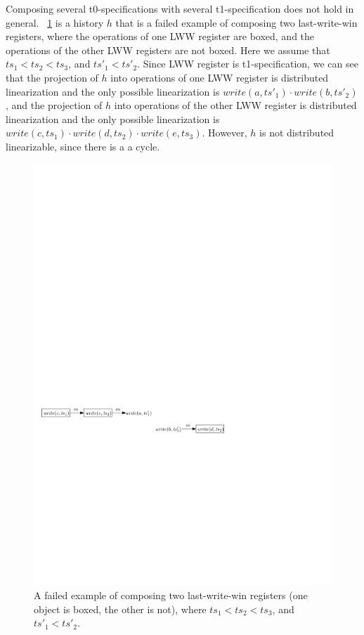 Composing several t0-specifications with several t1-specification does not hold in general. \figurename~\ref{fig:a failed example of composing two last-write-win registers} is a history $h$ that is a failed example of composing two last-write-win registers, where the operations of one LWW register are boxed, and the operations of the other LWW registers are not boxed. Here we assume that $\mathit{ts}_1 < \mathit{ts}_2 < \mathit{ts}_3$, and $\mathit{ts}'_1 < \mathit{ts}'_2$. Since LWW register is t1-specification, we can see that the projection of $h$ into operations of one LWW register is distributed linearization and the only possible linearization is $\mathit{write}(a,\mathit{ts}'_1) \cdot \mathit{write}(b,\mathit{ts}'_2)$, and the projection of $h$ into operations of the other LWW register is distributed linearization and the only possible linearization is $\mathit{write}(c,\mathit{ts}_1) \cdot \mathit{write}(d,\mathit{ts}_2) \cdot \mathit{write}(e,\mathit{ts}_3)$. However, $h$ is not distributed linearizable, since there is a a cycle.

\begin{figure}[t]
  \centering
  \includegraphics[width=0.7 \textwidth]{figures/LWWReg-LWWReg-NoSTS.pdf}
\vspace{-10pt}
  \caption{A failed example of composing two last-write-win registers (one object is boxed, the other is not), where $\mathit{ts}_1 < \mathit{ts}_2 < \mathit{ts}_3$, and $\mathit{ts}'_1 < \mathit{ts}'_2$.}
  \label{fig:a failed example of composing two last-write-win registers}
\end{figure}


